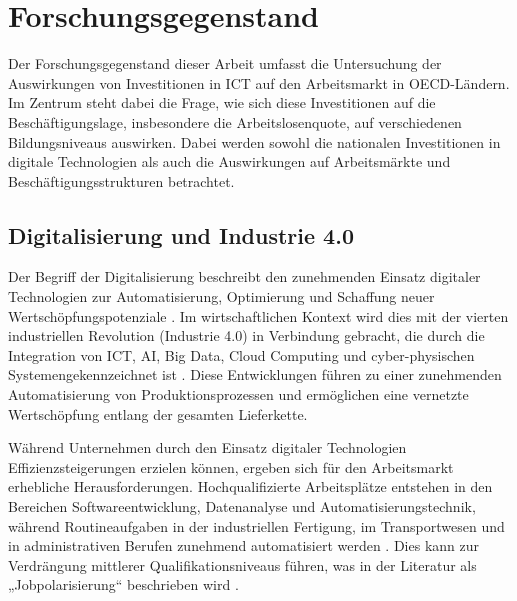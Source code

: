 
\section{Forschungsgegenstand}

Der Forschungsgegenstand dieser Arbeit umfasst die Untersuchung der Auswirkungen von 
Investitionen in \ac{ICT} auf den Arbeitsmarkt in \ac{OECD}-Ländern. Im Zentrum steht dabei die 
Frage, wie sich diese Investitionen auf die Beschäftigungslage, insbesondere die 
Arbeitslosenquote, auf verschiedenen Bildungsniveaus auswirken. Dabei werden sowohl die 
nationalen Investitionen in digitale Technologien als auch die Auswirkungen auf Arbeitsmärkte und 
Beschäftigungsstrukturen betrachtet. 


\subsection{Digitalisierung und Industrie 4.0}

Der Begriff der Digitalisierung beschreibt den zunehmenden Einsatz digitaler Technologien zur 
Automatisierung, Optimierung und Schaffung neuer Wertschöpfungspotenziale 
\parencite[vgl.][S. 6]{brennen2016theinternational}. Im wirtschaftlichen Kontext wird dies mit 
der vierten industriellen Revolution (Industrie 4.0) in Verbindung gebracht, die durch die 
Integration von \ac{ICT}, \ac{AI}, Big Data, Cloud Computing und cyber-physischen 
Systemengekennzeichnet ist \parencite[vgl.][S. 13–14]{kagermann2013recommendations}. Diese 
Entwicklungen führen zu einer zunehmenden Automatisierung von Produktionsprozessen und 
ermöglichen eine vernetzte Wertschöpfung entlang der gesamten Lieferkette. 

Während Unternehmen durch den Einsatz digitaler Technologien Effizienzsteigerungen erzielen 
können, ergeben sich für den Arbeitsmarkt erhebliche Herausforderungen. Hochqualifizierte 
Arbeitsplätze entstehen in den Bereichen Softwareentwicklung, Datenanalyse und 
Automatisierungstechnik, während Routineaufgaben in der industriellen Fertigung, im 
Transportwesen und in administrativen Berufen zunehmend automatisiert werden 
\parencite[vgl.][S. 36–38]{frey2013thefuture}. Dies kann zur Verdrängung mittlerer 
Qualifikationsniveaus führen, was in der Literatur als „Jobpolarisierung“ beschrieben wird 
\parencite[vgl.][S. 1070]{acemoglu2011skills}. 

